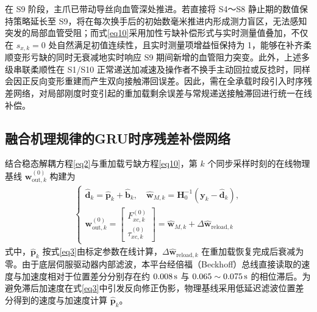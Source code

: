 \documentclass{JQRnew}
\begin{document}
在 S9 阶段，主爪已带动导丝向血管深处推进。若直接将 S4～S8 静止期的数值保持策略延长至 S9，将在每次换手后的初始数毫米推进内形成测力盲区，无法感知突发的局部血管受阻；而式\eqref{eq10}采用加性亏缺补偿形式与实时测量值叠加，不仅在 $s_{x,k} = 0$ 处自然满足初值连续性，且实时测量项增益恒保持为 1，能够在补齐柔顺变形亏缺的同时无衰减地实时响应 S9 期间新增的血管阻力突变。此外，上述多级串联柔顺性在 S1/S10 正常递送加减速及操作者不换手主动回拉或反捻时，同样会因正反向变形重建而产生双向接触滞回误差。因此，需在全承载时段引入时序残差网络，对局部刚度时变引起的重加载剩余误差与常规递送接触滞回进行统一在线补偿。

\subsection{融合机理规律的GRU时序残差补偿网络}

结合稳态解耦方程\eqref{eq2}与重加载亏缺方程\eqref{eq10}，第 $k$ 个同步采样时刻的在线物理基线 $\bm{w}_{\text{out},k}^{(0)}$ 构建为
\begin{align}
	\label{eq11}
	\begin{cases}
		\widehat{\bm{d}}_{k} = \widehat{\bm{p}}_{k} + \widehat{\bm{b}}_{k},\quad \widehat{\bm{w}}_{M,k} = \bm{H}_{0}^{-1}(\bm{y}_{k} - \widehat{\bm{d}}_{k}), \\
		\bm{w}_{\text{out},k}^{(0)} =
		\begin{bmatrix}
			F_{xc,k}^{(0)} \\
			\tau_{xc,k}^{(0)}
		\end{bmatrix}
		= \widehat{\bm{w}}_{M,k} + \Delta\widehat{\bm{w}}_{\text{reload},k}
	\end{cases}
\end{align}
式中，$\widehat{\bm{p}}_{k}$ 按式\eqref{eq3}由标定参数在线计算，$\Delta\widehat{\bm{w}}_{\text{reload},k}$ 在重加载恢复完成后衰减为零。由于底层伺服驱动器内部滤波，本平台经倍福（Beckhoff）总线直接读取的速度与加速度相对于位置差分分别存在约 $0.008\,{\rm s}$ 与 $0.065 \sim 0.075\,{\rm s}$ 的相位滞后。为避免滞后加速度在式\eqref{eq3}中引发反向修正伪影，物理基线采用低延迟滤波位置差分得到的速度与加速度计算 $\widehat{\bm{p}}_{k}$。
\end{document}
